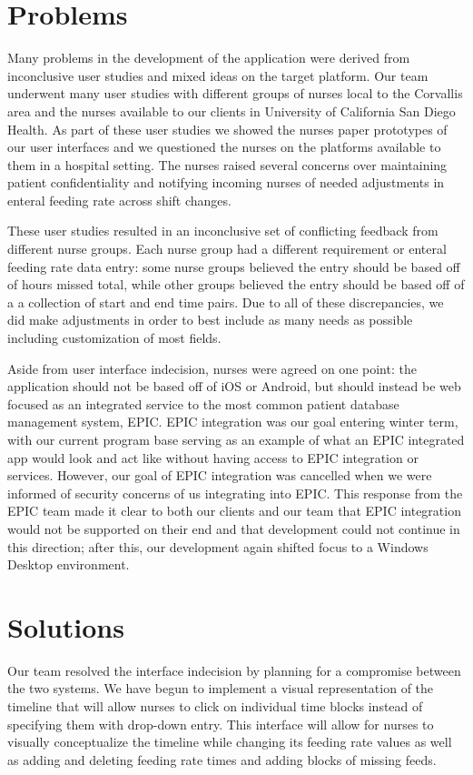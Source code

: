 \documentclass[onecolumn, draftclsnofoot,10pt, compsoc]{IEEEtran}
\begin{document}
\section{Problems}
Many problems in the development of the application were derived from inconclusive user studies and mixed ideas on the target platform.
Our team underwent many user studies with different groups of nurses local to the Corvallis area and the nurses available to our clients in University of California San Diego Health.
As part of these user studies we showed the nurses paper prototypes of our user interfaces and we questioned the nurses on the platforms available to them in a hospital setting.
The nurses raised several concerns over maintaining patient confidentiality and notifying incoming nurses of needed adjustments in enteral feeding rate across shift changes.

These user studies resulted in an inconclusive set of conflicting feedback from different nurse groups.
Each nurse group had a different requirement or enteral feeding rate data entry: some nurse groups believed the entry should be based off of hours missed total, while other groups believed the entry should be based off of a a collection of start and end time pairs. Due to all of these discrepancies, we did make adjustments in order to best include as many needs as possible including customization of most fields. 

Aside from user interface indecision, nurses were agreed on one point: the application should not be based off of iOS or Android, but should instead be web focused as an integrated service to the most common patient database management system, EPIC.
EPIC integration was our goal entering winter term, with our current program base serving as an example of what an EPIC integrated app would look and act like without having access to EPIC integration or services.
However, our goal of EPIC integration was cancelled when we were informed of security concerns of us integrating into EPIC.
This response from the EPIC team made it clear to both our clients and our team that EPIC integration would not be supported on their end and that development could not continue in this direction; after this, our development again shifted focus to a Windows Desktop environment.

\section{Solutions}
Our team resolved the interface indecision by planning for a compromise between the two systems.
We have begun to implement a visual representation of the timeline that will allow nurses to click on individual time blocks instead of specifying them with drop-down entry.
This interface will allow for nurses to visually conceptualize the timeline while changing its feeding rate values as well as adding and deleting feeding rate times and adding blocks of missing feeds.
\end{document}
